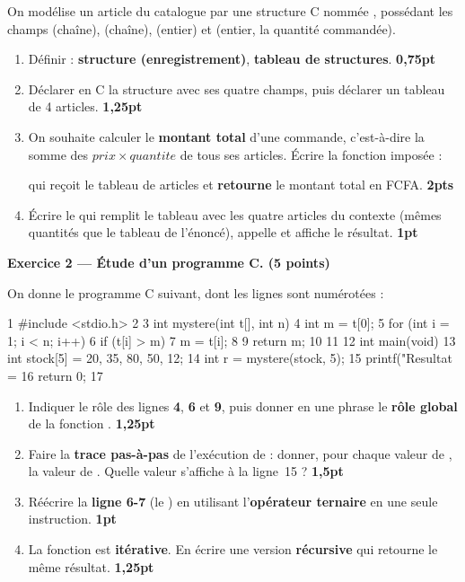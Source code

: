 \smallskip
On modélise un article du catalogue par une structure C nommée , possédant
les champs  (chaîne),  (chaîne),  (entier) et
 (entier, la quantité commandée).

\begin{enumerate}[label=\textbf{\arabic*-},leftmargin=2.2em]
\item Définir : \textbf{structure (enregistrement)}, \textbf{tableau de structures}. \hfill \textbf{0,75pt}
\item Déclarer en C la structure  avec ses quatre champs, puis déclarer un
tableau  de 4 articles. \hfill \textbf{1,25pt}
\item On souhaite calculer le \textbf{montant total} d'une commande, c'est-à-dire la somme
des $prix \times quantite$ de tous ses articles. Écrire la fonction imposée :
\begin{center}
\end{center}
qui reçoit le tableau  de  articles et \textbf{retourne} le montant total
en FCFA. \hfill \textbf{2pts}
\item Écrire le  qui remplit le tableau  avec les quatre articles
du contexte (mêmes quantités que le tableau de l'énoncé), appelle  et
affiche le résultat. \hfill \textbf{1pt}
\end{enumerate}

\bigskip
\textbf{Exercice 2 — Étude d'un programme C. \hfill (5 points)}

\smallskip
On donne le programme C suivant, dont les lignes sont numérotées :

\begin{codec}
1   #include <stdio.h>
2
3   int mystere(int t[], int n) {
4       int m = t[0];
5       for (int i = 1; i < n; i++) {
6           if (t[i] > m)
7               m = t[i];
8       }
9       return m;
10  }
11
12  int main(void) {
13      int stock[5] = {20, 35, 80, 50, 12};
14      int r = mystere(stock, 5);
15      printf("Resultat = %
16      return 0;
17  }
\end{codec}

\begin{enumerate}[label=\textbf{\arabic*-},leftmargin=2.2em]
\item Indiquer le rôle des lignes \textbf{4}, \textbf{6} et \textbf{9}, puis donner en une
phrase le \textbf{rôle global} de la fonction . \hfill \textbf{1,25pt}
\item Faire la \textbf{trace pas-à-pas} de l'exécution de  : donner,
pour chaque valeur de , la valeur de . Quelle valeur s'affiche à la ligne~15 ? \hfill \textbf{1,5pt}
\item Réécrire la \textbf{ligne 6-7} (le ) en utilisant l'\textbf{opérateur
ternaire}  en une seule instruction. \hfill \textbf{1pt}
\item La fonction  est \textbf{itérative}. En écrire une version
\textbf{récursive}  qui retourne le même résultat. \hfill \textbf{1,25pt}
\end{enumerate}

